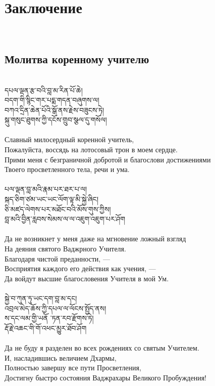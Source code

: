 \section{Заключение}
\\
\subsection{Молитва коренному учителю}
\\
\ti
དཔལ་ལྡན་རྩ་བའི་བླ་མ་རིན་པོ་ཆེ། \\
བདག་གི་སྙིང་གར་པདྨ་གདན་བཞུགས་ལ། \\
བཀའ་དྲིན་ཆེན་པོའི་སྒོ་ནས་རྗེས་བཟུངས་ཏེ། \\
སྐུ་གསུང་ཐུགས་ཀྱི་དངོས་གྲུབ་སྩལ་དུ་གསོལ།\\
\\
\ru
Славный милосердный коренной учитель,\\
Пожалуйста, воссядь на лотосовый трон в моем сердце.\\
Прими меня с безграничной добротой и благослови достижениями\\
Твоего просветленного тела, речи и ума.\\
\\
\ti
པལ་ལྡན་བླ་མའི་རྣམ་པར་ཐར་པ་ལ། \\
སྐད་ཅིག་ཙམ་ཡང་ཡང་ལོག་ལྟ་མི་སྐྱེ་ཞིང། \\
ཅི་མཛད་ལེགས་པར་མཐོང་བའི་མོས་གུས་ཀྱིས། \\
བླ་མའི་བྱིན་རླབས་སེམས་ལ་ལ་འཇུག་འཇུག་པར་ཤོག \\
\\
\ru
Да не возникнет у меня даже на мгновение ложный взгляд\\
На деяния святого Ваджрного Учителя.\\
Благодаря чистой преданности, —\\
Восприятия каждого его действия как учения, —\\
Да войдут высшие благословения Учителя в мой Ум.\\
\\
\ti
སྐྱེ་བ་ཀུན་ཏུ་ཡང་དག་བླ་མ་དང། \\
འབྲལ་མེད་ཆོས་ཀྱི་དཔལ་ལ་ལོངས་སྤྱོད་ནས། \\
ས་དང་ལམ་གྱི་ཡནོ ་ཏན་རབ་རྫོགས་ཏེ། \\
རྡོ་རྗེ་འཆང་གི་གོ་འཕང་མྱུར་ཐོབ་ཤོག \\
\\
\ru
Да не буду я разделен во всех рождениях со святым Учителем.\\
И, насладившись величием Дхармы,\\
Полностью завершу все пути Просветления,\\
Достигну быстро состояния Ваджрахары Великого Пробуждения!

